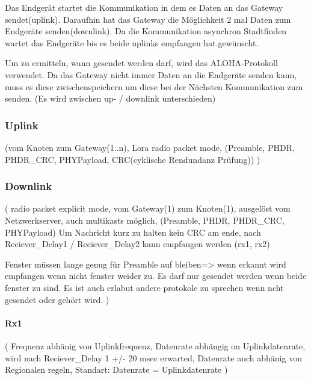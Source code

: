 \documentclass[a4paper,12pt]{article}
\begin{document}
            Das Endgerät startet die Kommunikation in dem es Daten an das Gateway sendet(uplink). Daraufhin hat das Gateway die Möglichkeit 2 mal Daten zum Endgeräte senden(downlink). Da die Kommunikation asynchron Stadtfinden wartet das Endgeräte bis es beide uplinks empfangen hat.gewünscht.
            
            Um zu ermitteln, wann gesendet werden darf, wird das ALOHA-Protokoll verwendet.
            Da das Gateway nicht immer Daten an die Endgeräte senden kann, muss es diese zwischenspeichern um diese bei der Nächsten Kommunikation zum senden.
            \cite{LoRaSpec}(Es wird zwischen up- / downlink unterschieden)

            \subsubsection{Uplink}

                \cite{LoRaSpec} 
                    (vom Knoten zum Gateway(1..n), Lora radio packet mode, (Preamble, PHDR, PHDR\_CRC, PHYPayload, CRC(cyklische Rendundanz Prüfung))
                 )

            \subsubsection{Downlink}

                \cite{LoRaSpec}
                (
                    radio packet explicit mode, vom Gateway(1) zum Knoten(1), ausgelöst vom Netzwerkserver, auch multikasts möglich, (Preamble, PHDR, PHDR\_CRC, PHYPayload)
                Um Nachricht kurz zu halten kein CRC am ende, nach Reciever\_Delay1 / Reciever\_Delay2 kann empfangen werden (rx1, rx2) 
                
                Fenster müssen lange genug für Preamble auf bleiben=> wenn erkannt wird empfangen wenn nicht fenster weider zu. Es darf nur gesendet werden wenn beide fenster zu sind.
                Es ist auch erlabut andere protokole zu sprechen wenn ncht gesendet oder gehört wird.
                )
                \paragraph{Rx1}
                    \cite{LoRaSpec}(
                        Frequenz abhänig von Uplinkfrequenz, Datenrate abhängig on Uplinkdatenrate, wird nach Reciever\_Delay 1 +/- 20 msec erwarted, Datenrate auch abhänig von Regionalen regeln, Standart: Datenrate = Uplinkdatenrate
                    )
\end{document}
